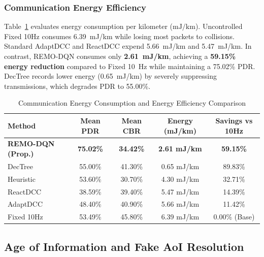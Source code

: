 \documentclass[journal]{IEEEtran}
\begin{document}
\subsubsection{Communication Energy Efficiency}
Table~\ref{tab:energy_stats} evaluates energy consumption per kilometer ($\text{mJ/km}$). Uncontrolled Fixed 10Hz consumes 6.39~mJ/km while losing most packets to collisions. Standard AdaptDCC and ReactDCC expend 5.66~mJ/km and 5.47~mJ/km. In contrast, REMO-DQN consumes only \textbf{2.61~mJ/km}, achieving a \textbf{59.15\% energy reduction} compared to Fixed 10~Hz while maintaining a 75.02\% PDR. DecTree records lower energy (0.65~mJ/km) by severely suppressing transmissions, which degrades PDR to 55.00\%.

\begin{table}[t]
\caption{Communication Energy Consumption and Energy Efficiency Comparison}
\label{tab:energy_stats}
\centering
\scriptsize
\begin{tabularx}{\linewidth}{l c c c c}
\toprule
\textbf{Method} & \textbf{Mean PDR} & \textbf{Mean CBR} & \textbf{Energy (mJ/km)} & \textbf{Savings vs 10Hz} \\
\midrule
\textbf{REMO-DQN (Prop.)} & \textbf{75.02\%} & \textbf{34.42\%} & \textbf{2.61 mJ/km} & \textbf{59.15\%} \\
DecTree & 55.00\% & 41.30\% & 0.65 mJ/km & 89.83\% \\
Heuristic & 53.60\% & 30.70\% & 4.30 mJ/km & 32.71\% \\
ReactDCC & 38.59\% & 39.40\% & 5.47 mJ/km & 14.39\% \\
AdaptDCC & 48.40\% & 40.90\% & 5.66 mJ/km & 11.42\% \\
Fixed 10Hz & 53.49\% & 45.80\% & 6.39 mJ/km & 0.00\% (Base) \\
\bottomrule
\end{tabularx}
\end{table}

\subsection{Age of Information and Fake AoI Resolution}
\end{document}
